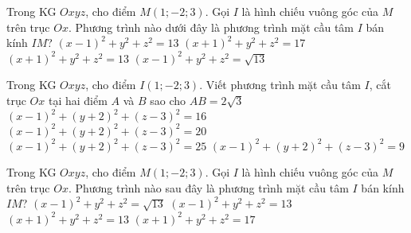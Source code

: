 \begin{ex}%
Trong KG $Oxyz$, cho điểm $M(1;-2;3)$. Gọi $I$ là hình chiếu vuông góc của $M$ trên trục $Ox$. Phương trình nào dưới đây là phương trình mặt cầu tâm $I$ bán kính $IM$?
\choice
{\True $(x-1)^2+y^2+z^2=13$}
{$(x+1)^2+y^2+z^2=17$}
{$(x+1)^2+y^2+z^2=13$}
{$(x-1)^2+y^2+z^2=\sqrt{13}$}
\end{ex}

\begin{ex}%
Trong KG $Oxyz$, cho điểm $I(1;-2;3)$. Viết phương trình mặt cầu tâm $I$, cắt trục $Ox$ tại hai điểm $A$ và $B$ sao cho $AB=2\sqrt{3}$
\choice
{\True $(x-1)^2+(y+2)^2+(z-3)^2=16$}
{$(x-1)^2+(y+2)^2+(z-3)^2=20$}
{$(x-1)^2+(y+2)^2+(z-3)^2=25$}
{$(x-1)^2+(y+2)^2+(z-3)^2=9$}
\end{ex}

\begin{ex}%
Trong KG $Oxyz$, cho điểm $M(1;-2;3)$. Gọi $I$ là hình chiếu vuông góc của $M$ trên trục $Ox$. Phương trình nào sau đây là phương trình mặt cầu tâm $I$ bán kính $IM$?
\choice
{$(x-1)^2+y^2+z^2=\sqrt{13}$}
{\True $(x-1)^2+y^2+z^2=13$}
{$(x+1)^2+y^2+z^2=13$}
{$(x+1)^2+y^2+z^2=17$}
\end{ex}

